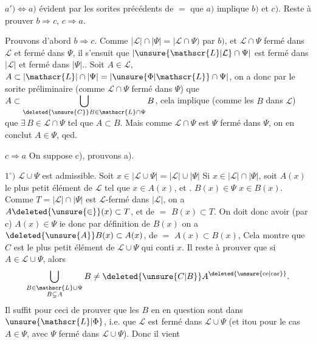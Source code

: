 $a')\Leftrightarrow a)$ évident par les sorites précédents de \ensuremath{=} que $a)$ implique $b)$ et $c)$. Reste à prouver $b\Rightarrow c$, $c\Rightarrow a$.

Prouvons d'abord $b\Rightarrow c$. Comme $|\mathscr{L}|\cap|\Psi|=\lvert\mathscr{L}\cap\Psi)$ par $b)$, et $\mathscr{L}\cap\Psi$ fermé dans $\mathscr{L}$ et
fermé dans $\Psi$, il s'ensuit que $\lvert\unsure{\mathscr{L}|\mathcal{L}}\cap\Psi\rvert$ est fermé dans $\lvert\mathscr{L}\rvert$ et fermé dans $\lvert\Psi\rvert$.. Soit $A\in\mathscr{L}$, $A\subset\lvert\mathscr{L}\rvert\cap\lvert\Psi\rvert=\lvert\unsure{\Phi|\mathscr{L}}\cap\Psi\rvert$, on a donc par le sorite préliminaire (comme $\mathscr{L}\cap\Psi$ fermé dans $\Psi$) que $A\subset\displaystyle\bigcup_{\deleted{\unsure{C}}B\in\mathscr{L}\cap\Psi}B$, cela implique  (comme les $B$ dans $\mathscr{L}$) que $\exists\,B\in\mathscr{L}\cap\Psi$ tel que $A\subset B$.
 Mais comme $\mathscr{L}\cap\Psi$ est $\Psi$ fermé dans $\Psi$, on en conclut $A\in\Psi$, qed.

$c\Longrightarrow a$ \quad On suppose c), prouvons a).

$1^\circ)$ $\mathscr{L}\cup\Psi$ est admissible. Soit $x\in\lvert\mathscr{L}\cup\Psi\rvert=\lvert\mathscr{L}\rvert\cup\lvert\Psi\rvert$  Si $x\in\lvert\mathscr{L}\rvert\cap\lvert\Psi\rvert$, soit $A(x)$ le plus petit élément de $\mathscr{L}$ tel que $x\in A(x)$, et . $B(x)\in\Psi$  $x\in B(x)$. Comme $T=\lvert\mathscr{L}\rvert\cap\lvert\Psi\rvert$ est $\mathscr{L}$-fermé dans $\lvert\mathscr{L}\rvert$, on a $A\deleted{\unsure{\in}}(x)\subset T$, et de $=$ $B(x)\subset T$. On doit donc avoir (par c) $A(x)\in\Psi$ ie  donc par définition de $B(x)$ on a $\deleted{\unsure{A}}B(x)\subset A(x)$, de $=$ $A(x)\subset B(x)$, 
  Cela montre que $C$ est le plus petit élément de $\mathscr{L}\cup\Psi$ qui conti $x$. Il reste à prouver que si $A\in\mathscr{L}\cup\Psi$, alors  \[
 \bigcup_{\substack{B\in\mathscr{L}\cup\Psi\\B\subsetneq A}}B
 \ne\deleted{\unsure{C|B}}A^{\text{\deleted{\unsure{ce|car}}}} .
\]  Il  suffit pour ceci de prouver que  les $B$ en
en question sont dans $\unsure{\mathscr{L}|\Phi}$, i.e. que $\mathscr{L}$ est fermé dans $\mathscr{L}\cup\Psi$ (et itou pour le cas $A\in\Psi$, avec $\Psi$ fermé dans $\mathscr{L}\cup\Psi$). Donc il vient

